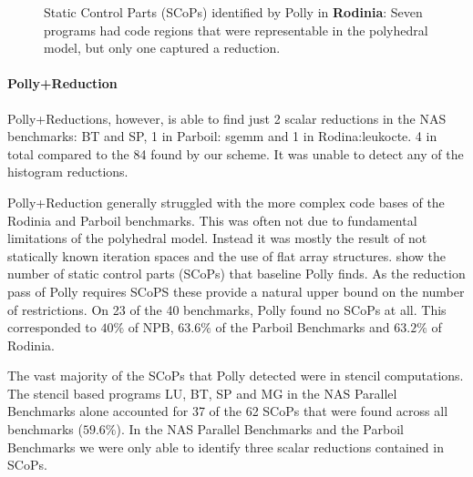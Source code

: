 \begin{figure}[p]
    \caption{Static Control Parts (SCoPs) identified by Polly in {\bf Rodinia}:
             Seven programs had code regions that were representable in
             the polyhedral model, but only one captured a reduction.}
    \label{rodinia_scops}
\end{figure}

\paragraph*{Polly+Reduction}
Polly+Reductions, however, is able to find just 2 scalar reductions in
the NAS benchmarks: BT and SP, 1 in Parboil: sgemm and 1 in
Rodina:leukocte. 4 in total compared to the 84 found by our scheme. It
was unable to detect any of the histogram reductions.

Polly+Reduction generally struggled with the more complex code bases of the
Rodinia and Parboil benchmarks.  This was often not due to fundamental
limitations of the polyhedral model.  Instead it was mostly the result
of not statically known iteration spaces and the use of flat array
structures. 
show the number of static control
parts (SCoPs) that baseline Polly finds. As the reduction pass of
Polly requires SCoPS these provide a natural upper bound on the
number of restrictions.  On 23 of the 40 benchmarks, Polly found no
SCoPs at all.  This corresponded to $40\%$ of NPB, $63.6\%$ of the
Parboil Benchmarks and $63.2\%$ of Rodinia.

The vast majority of the SCoPs that Polly detected were in stencil computations.
The stencil based programs LU, BT, SP and MG in the NAS Parallel Benchmarks alone accounted for 37 of the 62 SCoPs that were found across all benchmarks ($59.6\%$). 
In the NAS Parallel Benchmarks and the Parboil Benchmarks we were only able to identify three scalar reductions contained in SCoPs.


